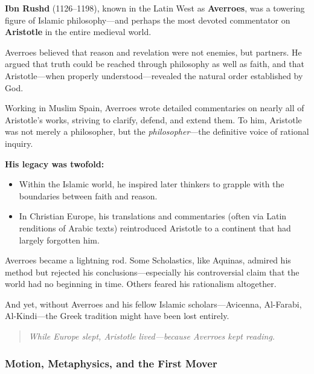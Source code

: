 \begin{tcolorbox}[colback=gray!5!white, colframe=black!75!white, title={Historical Sidebar: Averroes and the Bridge of Aristotle}]

    \textbf{Ibn Rushd} (1126–1198), known in the Latin West as \textbf{Averroes}, was a towering figure of Islamic philosophy—and perhaps the most devoted commentator on \textbf{Aristotle} in the entire medieval world.
    
    Averroes believed that reason and revelation were not enemies, but partners. He argued that truth could be reached through philosophy as well as faith, and that Aristotle—when properly understood—revealed the natural order established by God.
    
    Working in Muslim Spain, Averroes wrote detailed commentaries on nearly all of Aristotle’s works, striving to clarify, defend, and extend them. To him, Aristotle was not merely a philosopher, but the \textit{philosopher}—the definitive voice of rational inquiry.
    
    \medskip
    
    \textbf{His legacy was twofold:}
    \begin{itemize}
        \item Within the Islamic world, he inspired later thinkers to grapple with the boundaries between faith and reason.
        \item In Christian Europe, his translations and commentaries (often via Latin renditions of Arabic texts) reintroduced Aristotle to a continent that had largely forgotten him.
    \end{itemize}
    
    Averroes became a lightning rod. Some Scholastics, like Aquinas, admired his method but rejected his conclusions—especially his controversial claim that the world had no beginning in time. Others feared his rationalism altogether.
    
    And yet, without Averroes and his fellow Islamic scholars—Avicenna, Al-Farabi, Al-Kindi—the Greek tradition might have been lost entirely.
    
    \begin{quote}
    \textit{While Europe slept, Aristotle lived—because Averroes kept reading.}
    \end{quote}
    
\end{tcolorbox}


\subsubsection*{Motion, Metaphysics, and the First Mover}

